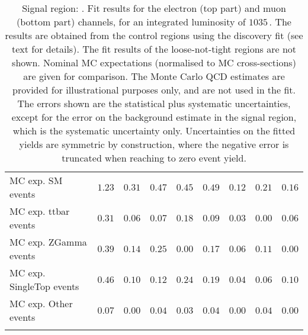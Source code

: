 \begin{table}
\begin{center}
{\begin{tabular*}{\textwidth}{@{\extracolsep{\fill}}lrrrrrrrr}
 \noalign{\smallskip}\hline\noalign{\smallskip}
MC exp. SM events              & $1.23$          & $0.31$          & $0.47$          & $0.45$          & $0.49$          & $0.12$          & $0.21$          & $0.16$              \\
\noalign{\smallskip}\hline\noalign{\smallskip}
        MC exp. ttbar events         & $0.31$          & $0.06$          & $0.07$          & $0.18$          & $0.09$          & $0.03$          & $0.00$          & $0.06$              \\
        MC exp. ZGamma events         & $0.39$          & $0.14$          & $0.25$          & $0.00$          & $0.17$          & $0.06$          & $0.11$          & $0.00$              \\
        MC exp. SingleTop events         & $0.46$          & $0.10$          & $0.12$          & $0.24$          & $0.19$          & $0.04$          & $0.06$          & $0.10$              \\
        MC exp. Other events         & $0.07$          & $0.00$          & $0.04$          & $0.03$          & $0.04$          & $0.00$          & $0.04$          & $0.00$              \\
\noalign{\smallskip}\hline\noalign{\smallskip}
\end{tabular*}
}
\end{center}
\caption{Signal region: . Fit results for the electron (top part) and muon (bottom part) channels, for an integrated luminosity of $1035$\,\ipb.
The results are obtained from the control regions using the discovery fit (see text for details). The fit results of the loose-not-tight regions are not shown.
Nominal MC expectations (normalised to MC cross-sections) are given for comparison. 
The Monte Carlo QCD estimates are provided for illustrational purposes only, and are not used in the fit.
The errors shown are the statistical plus systematic uncertainties, except for the error on the background estimate in the signal region, which is the systematic uncertainty only.
Uncertainties on the fitted yields are symmetric by construction, 
where the negative error is truncated when reaching to zero event yield.
}
\label{table.results.systematics.in.logL.fit.table.results.yields}
\end{table}
%